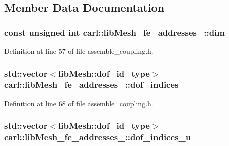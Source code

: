 \subsection{Member Data Documentation}
\hypertarget{classcarl_1_1lib_mesh__fe__addresses__3_a5f5ce3cc4f0ac44cf0ec4455928422e6}{}
\subsubsection[{dim}]{\setlength{\rightskip}{0pt plus 5cm}const unsigned int carl\+::lib\+Mesh\+\_\+fe\+\_\+addresses\+\_\+::dim}\label{classcarl_1_1lib_mesh__fe__addresses__3_a5f5ce3cc4f0ac44cf0ec4455928422e6}


Definition at line 57 of file assemble\+\_\+coupling.\+h.

\hypertarget{classcarl_1_1lib_mesh__fe__addresses__3_a124437d3ae6b57b70beb1fc110d72e96}{}
\subsubsection[{dof\+\_\+indices}]{\setlength{\rightskip}{0pt plus 5cm}std\+::vector$<$lib\+Mesh\+::dof\+\_\+id\+\_\+type$>$ carl\+::lib\+Mesh\+\_\+fe\+\_\+addresses\+\_\+::dof\+\_\+indices}\label{classcarl_1_1lib_mesh__fe__addresses__3_a124437d3ae6b57b70beb1fc110d72e96}


Definition at line 68 of file assemble\+\_\+coupling.\+h.

\hypertarget{classcarl_1_1lib_mesh__fe__addresses__3_a0b5abe23e90121a4b73076ee30ff0864}{}
\subsubsection[{dof\+\_\+indices\+\_\+u}]{\setlength{\rightskip}{0pt plus 5cm}std\+::vector$<$lib\+Mesh\+::dof\+\_\+id\+\_\+type$>$ carl\+::lib\+Mesh\+\_\+fe\+\_\+addresses\+\_\+::dof\+\_\+indices\+\_\+u}\label{classcarl_1_1lib_mesh__fe__addresses__3_a0b5abe23e90121a4b73076ee30ff0864}


